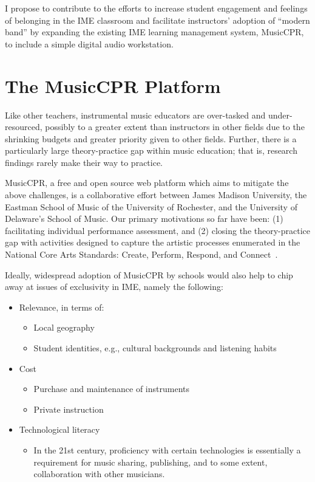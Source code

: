 \documentclass[manuscript,screen,review]{acmart}
\begin{document}
I propose to contribute to the efforts to increase student engagement and feelings of belonging in the IME classroom and facilitate instructors' adoption of ``modern band'' by expanding the existing IME learning management system, MusicCPR, to include a simple digital audio workstation.


\section{The M\MakeLowercase{usic}CPR Platform}
Like other teachers, instrumental music educators are over-tasked and under-resourced, possibly to a greater extent than instructors in other fields due to the shrinking budgets and greater priority given to other fields.
Further, there is a particularly large theory-practice gap within music education; that is, research findings rarely make their way to practice.

MusicCPR, a free and open source web platform which aims to mitigate the above challenges, is a collaborative effort between James Madison University, the Eastman School of Music of the University of Rochester, and the University of Delaware's School of Music. 
Our primary motivations so far have been: (1) facilitating individual performance assessment, and (2) closing the theory-practice gap with activities designed to capture the artistic processes enumerated in the National Core Arts Standards: Create, Perform, Respond, and Connect~\cite{core_arts, CPR}.

Ideally, widespread adoption of MusicCPR by schools would also help to chip away at issues of exclusivity in IME, namely the following:
\begin{itemize}
    \item Relevance, in terms of:
    \begin{itemize}
        \item Local geography
        \item Student identities, e.g., cultural backgrounds and listening habits
    \end{itemize}
    \item Cost
    \begin{itemize}
        \item Purchase and maintenance of instruments
        \item Private instruction 
    \end{itemize}
    \item Technological literacy
    \begin{itemize}
        \item In the 21st century, proficiency with certain technologies is essentially a requirement for music sharing, publishing, and to some extent, collaboration with other musicians. 
    \end{itemize}
\end{itemize}
\end{document}
